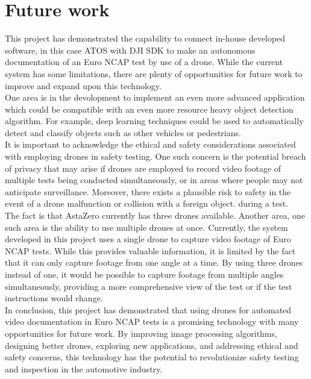 \chapter{Future work}
This project has demonstrated the capability to connect in-house developed software, in this case ATOS with DJI SDK to make an autonomous documentation of an Euro NCAP test by use of a drone. While the current system has some limitations, there are plenty of opportunities for future work to improve and expand upon this technology.
\\

 One area is in the devolopment to implement an even more advanced application which could be compatible with an even more resource heavy object detection algorithm. For example, deep learning techniques could be used to automatically detect and classify objects such as other vehicles or pedestrians. 
\\

It is important to acknowledge the ethical and safety considerations associated with employing drones in safety testing. One such concern is the potential breach of privacy that may arise if drones are employed to record video footage of multiple tests being conducted simultaneously, or in areas where people may not anticipate surveillance. Moreover, there exists a plausible risk to safety in the event of a drone malfunction or collision with a foreign object. during a test.
\\
\newline 
The fact is that AstaZero currently has three drones available. Another area, one such area is the ability to use multiple drones at once. Currently, the system developed in this project uses a single drone to capture video footage of Euro NCAP tests. While this provides valuable information, it is limited by the fact that it can only capture footage from one angle at a time. By using three drones instead of one, it would be possible to capture footage from multiple angles simultaneously, providing a more comprehensive view of the test  or if the test instructions would change.
\\
 
In conclusion, this project has demonstrated that using drones for automated video documentation in Euro NCAP tests is a promising technology with many opportunities for future work. By improving image processing algorithms, designing better drones, exploring new applications, and addressing ethical and safety concerns, this technology has the potential to revolutionize safety testing and inspection in the automotive industry.

